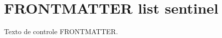 \documentclass{abntexto-ufc}
\begin{document}
\pretextual


\textual
\section{FRONTMATTER list sentinel}
Texto de controle FRONTMATTER.
\end{document}
